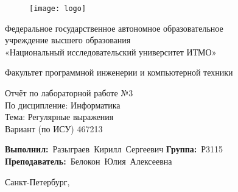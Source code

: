 \newcommand{\Faculty}{Факультет программной инженерии и компьютерной техники}

\newcommand{\TeacherPosition}{}
\newcommand{\TeacherName}{Белокон Юлия Алексеевна}

\newcommand{\LabSubject}{Информатика}
\newcommand{\LabNumber}{№3}
\newcommand{\LabName}{Регулярные выражения}
\newcommand{\Variant}{467213}
 
\newcommand{\StudentGroup}{Р3115}
\newcommand{\StudentName}{Разыграев Кирилл Сергеевич}


\thispagestyle{empty}
\setlength{\parindent}{0cm} %

\begin{figure}[h]
	\centering
	\texttt{[image: logo]}
\end{figure}
\vspace{-\baselineskip}


\begin{center}
	Федеральное государственное автономное образовательное \\
	учреждение высшего образования\\
	«Национальный исследовательский университет ИТМО»
\end{center}\par

\begin{center}
	\vspace{12pt}
	\Faculty
\end{center}\par

\vspace{\fill}
\begin{center}
	Отчёт по лабораторной работе \LabNumber \\
	По дисципление: \LabSubject \\
	Тема: \LabName \\
	Вариант (по ИСУ) \Variant
\end{center}\par

\vspace{\fill}
\vbox{
	\hfill
	\vbox{
		\hbox{\textbf{Выполнил:} \StudentName}
		\hbox{\textbf{Группа:} \StudentGroup \\}
		\hbox{\textbf{Преподаватель:} \TeacherPosition \TeacherName}
	}
} 


\vspace{\fill}
\begin{center}
	Санкт-Петербург, \the\year{}
\end{center}\par

\newpage

\setlength{\parindent}{1.25cm} %
